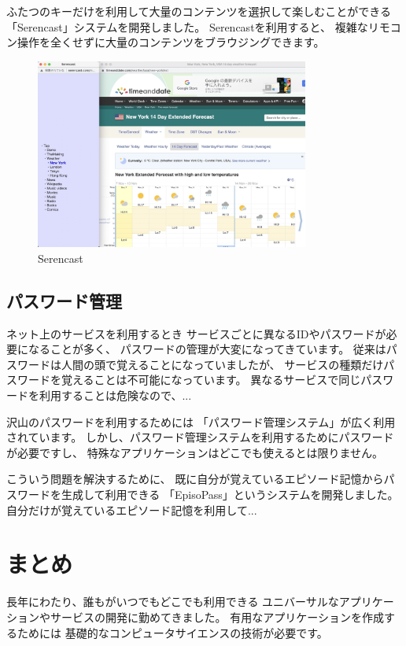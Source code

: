 \documentclass[topics]{compsoft} %
\begin{document}
ふたつのキーだけを利用して大量のコンテンツを選択して楽しむことができる
「Serencast」システムを開発しました\cite{Serencast}。
Serencastを利用すると、
複雑なリモコン操作を全くせずに大量のコンテンツをブラウジングできます。

\begin{figure}[t]
  \includegraphics[width=9cm,bb=0 0 2510 1746]{figures/bb4027e2e210bc16450f0120a2987458.jpg}
  \caption{Serencast}
  \label{example1}
\end{figure}

\subsection{パスワード管理}

ネット上のサービスを利用するとき
サービスごとに異なるIDやパスワードが必要になることが多く、
パスワードの管理が大変になってきています。
従来はパスワードは人間の頭で覚えることになっていましたが、
サービスの種類だけパスワードを覚えることは不可能になっています。
異なるサービスで同じパスワードを利用することは危険なので、...

沢山のパスワードを利用するためには
「パスワード管理システム」が広く利用されています。
しかし、パスワード管理システムを利用するためにパスワードが必要ですし、
特殊なアプリケーションはどこでも使えるとは限りません。

こういう問題を解決するために、
既に自分が覚えているエピソード記憶からパスワードを生成して利用できる
「EpisoPass」というシステムを開発しました。
自分だけが覚えているエピソード記憶を利用して...

\section{まとめ}

長年にわたり、誰もがいつでもどこでも利用できる
ユニバーサルなアプリケーションやサービスの開発に勤めてきました。
有用なアプリケーションを作成するためには
基礎的なコンピュータサイエンスの技術が必要です。
\end{document}
